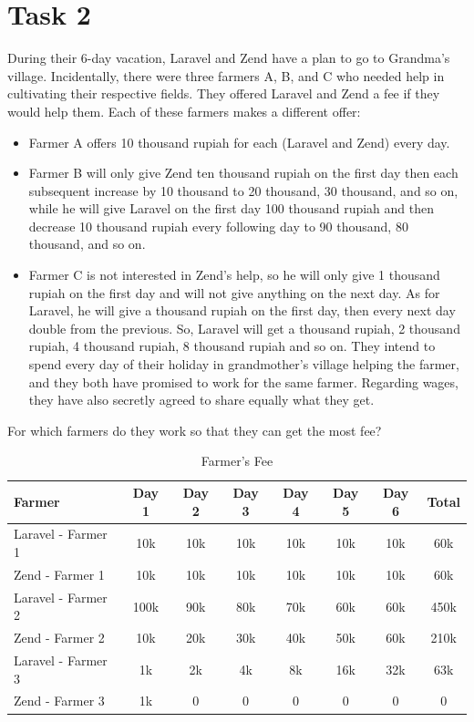 \documentclass[12pt,titlepage]{article}
\begin{document}
\section*{Task 2}

During their 6-day vacation, Laravel and Zend have a plan to go to Grandma's village. Incidentally, there were three
farmers A, B, and C who needed help in cultivating their respective fields. They offered Laravel and Zend a fee if they
would help them. Each of these farmers makes a different offer:
\begin{itemize}
    \item Farmer A offers 10 thousand rupiah for each (Laravel and Zend) every day.
    \item {
        Farmer B will only give Zend ten thousand rupiah on the first day then each subsequent increase by 10 thousand to 20
        thousand, 30 thousand, and so on, while he will give Laravel on the first day 100 thousand rupiah and then decrease 10
        thousand rupiah every following day to 90 thousand, 80 thousand, and so on.
    }
    \item {
        Farmer C is not interested in Zend's help, so he will only give 1 thousand rupiah on the first day and will not give
        anything on the next day. As for Laravel, he will give a thousand rupiah on the first day, then every next day double
        from the previous. So, Laravel will get a thousand rupiah, 2 thousand rupiah, 4 thousand rupiah, 8 thousand rupiah and
        so on. They intend to spend every day of their holiday in grandmother's village helping the farmer, and they both have
        promised to work for the same farmer. Regarding wages, they have also secretly agreed to share equally what they get.
    }
\end{itemize}
\pagebreak
For which farmers do they work so that they can get the most fee?

\setcounter{table}{1}
\begin{table}[h]
    \caption{Farmer's Fee}
    \begin{tabularx}{\textwidth}{|l|c|c|c|c|c|c|c|}
        \hline
        \textbf{Farmer} & \textbf{Day 1} & \textbf{Day 2} & \textbf{Day 3} & \textbf{Day 4} & \textbf{Day 5} & \textbf{Day 6} & \textbf{Total} \\
        \hline
        Laravel - Farmer 1 & 10k & 10k & 10k & 10k & 10k & 10k & 60k \\ \hline
        Zend - Farmer 1    & 10k & 10k & 10k & 10k & 10k & 10k & 60k \\ \hline
        Laravel - Farmer 2 & 100k & 90k & 80k & 70k & 60k & 60k & 450k \\ \hline
        Zend - Farmer 2    & 10k & 20k & 30k & 40k & 50k & 60k & 210k \\ \hline
        Laravel - Farmer 3 & 1k & 2k & 4k & 8k & 16k & 32k & 63k \\ \hline
        Zend - Farmer 3    & 1k & 0 & 0 & 0 & 0 & 0 & 0 \\ \hline
    \end{tabularx}
\end{table}
\end{document}
